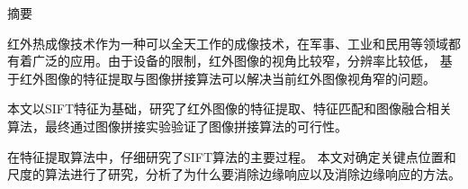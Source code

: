 \documentclass[10.5pt,a4paper]{article}
\numberwithin{equation}{section}
\numberwithin{figure}{section}
\numberwithin{table}{section}
\newcommand{\hei}{\CJKfamily{hei}}
\begin{document}
\makeatletter
\newcommand\engcontentsname{\sffamily\fontsize{18pt}{\baselineskip}\selectfont\centerline{\textbf{Contents}}}
\newcommand\tableofengcontents{%
    \if@twocolumn
      \@restonecoltrue\onecolumn
    \else
      \@restonecolfalse
    \fi
    \section*{\engcontentsname
        \@mkboth{%
           \MakeUppercase\engcontentsname}{\MakeUppercase\engcontentsname}}%
    \@starttoc{toe}%
    \if@restonecol\twocolumn\fi
    }
\newcommand\addengcontents[2]{%
    \addcontentsline{toe}{#1}{\protect\numberline{\csname the#1\endcsname}#2}}
\makeatother

\newcommand\echapter[1]{\addengcontents{chapter}{#1}}
\newcommand\esection[1]{\addengcontents{section}{#1}}
\newcommand\esubsection[1]{\addengcontents{subsection}{#1}}
\newcommand\etitlesection[1]{{\noindent\bfseries\fontsize{18pt}{\baselineskip}\selectfont\noindent\thesection\hspace{1em}#1\par\vspace{1em}}}
\newcommand\etitlesubsection[1]{{\noindent\hei\fontsize{15pt}{\baselineskip}\selectfont\thesubsection\hspace{1em}#1\par\vspace{1em}}}
\newcommand\mmx{\mathrm{x}}
\setcounter{tocdepth}{2}
{}
{\centering \hei \fontsize{18pt}{\baselineskip}\selectfont 摘\qquad 要\par}
\vspace{1em}
\fontsize{12pt}{18pt}\selectfont
红外热成像技术作为一种可以全天工作的成像技术，在军事、工业和民用等领域都有着广泛的应用。由于设备的限制，红外图像的视角比较窄，分辨率比较低，%
基于红外图像的特征提取与图像拼接算法可以解决当前红外图像视角窄的问题。\par
本文以SIFT特征为基础，研究了红外图像的特征提取、特征匹配和图像融合相关算法，最终通过图像拼接实验验证了图像拼接算法的可行性。\par
在特征提取算法中，仔细研究了SIFT算法的主要过程。%
本文对确定关键点位置和尺度的算法进行了研究，分析了为什么要消除边缘响应以及消除边缘响应的方法。\par
\end{document}
